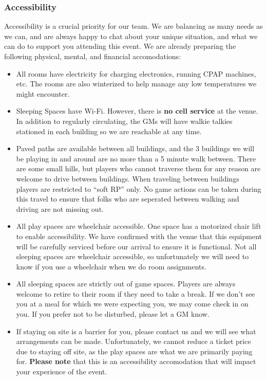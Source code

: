 \documentclass[sheet]{PP}
\begin{document}
\subsubsection{Accessibility}
Accessibility is a crucial priority for our team. We are balancing as many needs as we can, and are always happy to chat about your unique situation, and what we can do to support you attending this event. We are already preparing the following physical, mental, and financial accomodations:

\begin{itemize}
  \item All rooms have electricity for charging electronics, running CPAP machines, etc. The rooms are also winterized to help manage any low temperatures we might encounter.
  \item Sleeping Spaces have Wi-Fi. However, there is \textbf{no cell service} at the venue. In addition to regularly circulating, the GMs will have walkie talkies stationed in each building so we are reachable at any time.
  \item Paved paths are available between all buildings, and the 3 buildings we will be playing in and around are no more than a 5 minute walk between. There are some small hills, but players who cannot traverse them for any reason are welcome to drive between buildings. When traveling between buildings players are restricted to ``soft RP'' only. No game actions can be taken during this travel to ensure that folks who are seperated between walking and driving are not missing out.
  \item All play spaces are wheelchair accessible. One space has a motorized chair lift to enable accessibility. We have confirmed with the venue that this equipment will be carefully serviced before our arrival to ensure it is functional. Not all sleeping spaces are wheelchair accessible, so unfortunately we will need to know if you use a wheelchair when we do room assignments.
  \item All sleeping spaces are strictly out of game spaces. Players are always welcome to retire to their room if they need to take a break. If we don't see you at a meal for which we were expecting you, we may come check in on you. If you prefer not to be disturbed, please let a GM know.
  \item If staying on site is a barrier for you, please contact us and we will see what arrangements can be made. Unfortunately, we cannot reduce a ticket price due to staying off site, as the play spaces are what we are primarily paying for. \textbf{Please note} that this is an accessibility accomodation that will impact your experience of the event.

\end{itemize}
\end{document}
